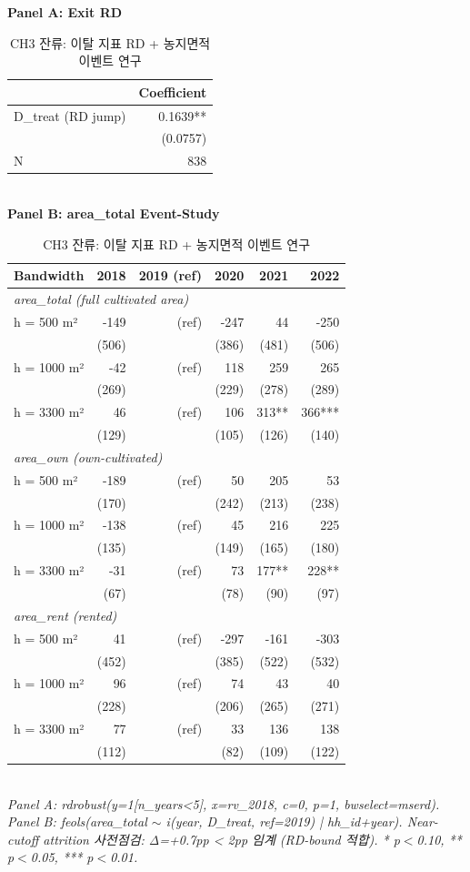 \begin{table}[t]
\centering
\caption{CH3 잔류: 이탈 지표 RD + 농지면적 이벤트 연구}
\label{tab:ch3_retention_ko}
\textbf{Panel A: Exit RD}\\
\begin{tabular}{lr}
\toprule
 & Coefficient \\
\midrule
D\_treat (RD jump) & 0.1639** \\
 & (0.0757) \\
N          & 838 \\
\bottomrule
\end{tabular}\\[1ex]
\textbf{Panel B: area\_total Event-Study}\\
\begin{tabular}{lrrrrr}
\toprule
Bandwidth & 2018 & 2019 (ref) & 2020 & 2021 & 2022 \\
\midrule
\multicolumn{6}{l}{\textit{area\_total (full cultivated area)}} \\
\midrule
h = 500 m² & -149 & (ref) & -247 & 44 & -250 \\
       & (506) &  & (386) & (481) & (506) \\
h = 1000 m² & -42 & (ref) & 118 & 259 & 265 \\
       & (269) &  & (229) & (278) & (289) \\
h = 3300 m² & 46 & (ref) & 106 & 313** & 366*** \\
       & (129) &  & (105) & (126) & (140) \\
\midrule
\multicolumn{6}{l}{\textit{area\_own (own-cultivated)}} \\
\midrule
h = 500 m² & -189 & (ref) & 50 & 205 & 53 \\
       & (170) &  & (242) & (213) & (238) \\
h = 1000 m² & -138 & (ref) & 45 & 216 & 225 \\
       & (135) &  & (149) & (165) & (180) \\
h = 3300 m² & -31 & (ref) & 73 & 177** & 228** \\
       & (67) &  & (78) & (90) & (97) \\
\midrule
\multicolumn{6}{l}{\textit{area\_rent (rented)}} \\
\midrule
h = 500 m² & 41 & (ref) & -297 & -161 & -303 \\
       & (452) &  & (385) & (522) & (532) \\
h = 1000 m² & 96 & (ref) & 74 & 43 & 40 \\
       & (228) &  & (206) & (265) & (271) \\
h = 3300 m² & 77 & (ref) & 33 & 136 & 138 \\
       & (112) &  & (82) & (109) & (122) \\
\bottomrule
\end{tabular}\\
\footnotesize\textit{Panel A: rdrobust(y=1[n\_years<5], x=rv\_2018, c=0, p=1, bwselect=mserd). Panel B: feols(area\_total $\sim$ i(year, D\_treat, ref=2019) | hh\_id+year). Near-cutoff attrition 사전점검: Δ=+0.7pp < 2pp 임계 (RD-bound 적합). * p$<$0.10, ** p$<$0.05, *** p$<$0.01.}
\end{table}

